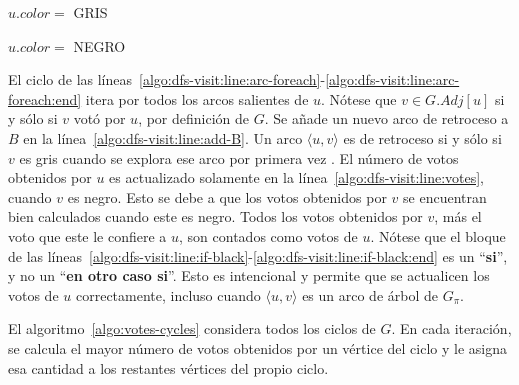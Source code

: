 \begin{algorithm}[!h]
    \caption{\dfsvisitcaption}
    \label{algo:dfs-visit}
    \DontPrintSemicolon
    \BlankLine

    $u.color =$ GRIS\;

    \label{algo:dfs-visit:line:arc-foreach:end}
    $u.color =$ NEGRO\;\label{algo:dfs-visit:line:set-black}
\end{algorithm}

El ciclo de las l\'ineas~\ref{algo:dfs-visit:line:arc-foreach}-\ref{algo:dfs-visit:line:arc-foreach:end} itera por todos los arcos salientes de $u$. N\'otese que $v \in G.Adj[u]$ si y s\'olo si $v$ vot\'o por $u$, por definici\'on de $G$.  Se a\~nade un nuevo arco de retroceso a $B$ en la l\'inea~\ref{algo:dfs-visit:line:add-B}. Un arco $\langle u, v \rangle$ es de retroceso si y s\'olo si $v$ es gris cuando se explora ese arco por primera vez \citep{intro-to-algo-3}. El n\'umero de votos obtenidos por $u$ es actualizado solamente en la l\'inea~\ref{algo:dfs-visit:line:votes}, cuando $v$ es negro. Esto se debe a que los votos obtenidos por $v$ se encuentran bien calculados cuando este es negro. Todos los votos obtenidos por $v$, m\'as el voto que este le confiere a $u$, son contados como votos de  $u$. N\'otese que el bloque de las l\'ineas~\ref{algo:dfs-visit:line:if-black}-\ref{algo:dfs-visit:line:if-black:end} es un ``\textbf{si}'', y no un ``\textbf{en otro caso si}''. Esto es intencional y permite que se actualicen los votos de $u$ correctamente, incluso cuando $\langle u, v \rangle$ es un arco de \'arbol de $G_\pi$. 

El algoritmo~\ref{algo:votes-cycles} considera todos los ciclos de $G$. En cada iteraci\'on, se calcula el mayor n\'umero de votos obtenidos por un v\'ertice del ciclo y le asigna esa cantidad a los restantes v\'ertices del propio ciclo. 


\begin{algorithm}[!h]
    \caption{\cyclevotescaption}
    \label{algo:votes-cycles}
    \DontPrintSemicolon
    \SetAlgoLined
    \BlankLine

\end{algorithm}

